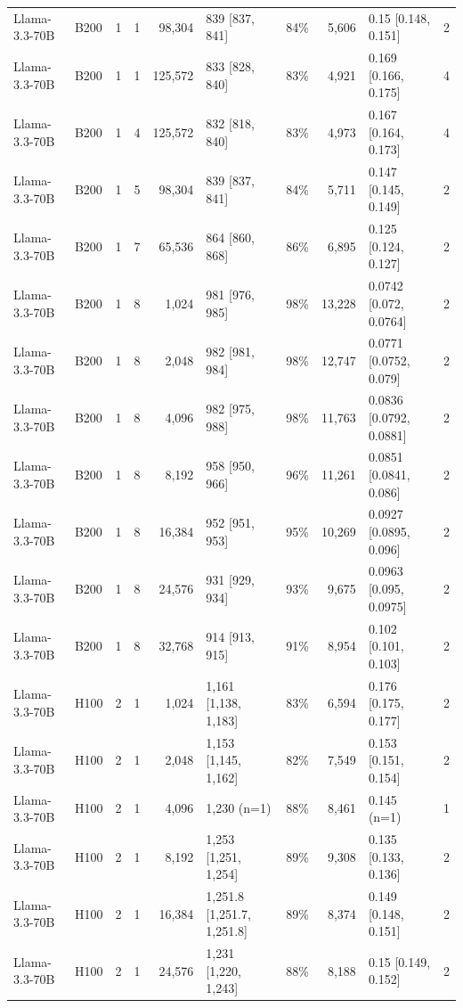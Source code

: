 \begin{landscape}
\begin{longtable}{llrrrlrrlr}
Llama-3.3-70B & B200 & 1 & 1 & 98,304 & 839 {[}837, 841{]} & 84\% & 5,606 & 0.15 {[}0.148, 0.151{]} & 2 \\
Llama-3.3-70B & B200 & 1 & 1 & 125,572 & 833 {[}828, 840{]} & 83\% & 4,921 & 0.169 {[}0.166, 0.175{]} & 4 \\
Llama-3.3-70B & B200 & 1 & 4 & 125,572 & 832 {[}818, 840{]} & 83\% & 4,973 & 0.167 {[}0.164, 0.173{]} & 4 \\
Llama-3.3-70B & B200 & 1 & 5 & 98,304 & 839 {[}837, 841{]} & 84\% & 5,711 & 0.147 {[}0.145, 0.149{]} & 2 \\
Llama-3.3-70B & B200 & 1 & 7 & 65,536 & 864 {[}860, 868{]} & 86\% & 6,895 & 0.125 {[}0.124, 0.127{]} & 2 \\
Llama-3.3-70B & B200 & 1 & 8 & 1,024 & 981 {[}976, 985{]} & 98\% & 13,228 & 0.0742 {[}0.072, 0.0764{]} & 2 \\
Llama-3.3-70B & B200 & 1 & 8 & 2,048 & 982 {[}981, 984{]} & 98\% & 12,747 & 0.0771 {[}0.0752, 0.079{]} & 2 \\
Llama-3.3-70B & B200 & 1 & 8 & 4,096 & 982 {[}975, 988{]} & 98\% & 11,763 & 0.0836 {[}0.0792, 0.0881{]} & 2 \\
Llama-3.3-70B & B200 & 1 & 8 & 8,192 & 958 {[}950, 966{]} & 96\% & 11,261 & 0.0851 {[}0.0841, 0.086{]} & 2 \\
Llama-3.3-70B & B200 & 1 & 8 & 16,384 & 952 {[}951, 953{]} & 95\% & 10,269 & 0.0927 {[}0.0895, 0.096{]} & 2 \\
Llama-3.3-70B & B200 & 1 & 8 & 24,576 & 931 {[}929, 934{]} & 93\% & 9,675 & 0.0963 {[}0.095, 0.0975{]} & 2 \\
Llama-3.3-70B & B200 & 1 & 8 & 32,768 & 914 {[}913, 915{]} & 91\% & 8,954 & 0.102 {[}0.101, 0.103{]} & 2 \\
Llama-3.3-70B & H100 & 2 & 1 & 1,024 & 1,161 {[}1,138, 1,183{]} & 83\% & 6,594 & 0.176 {[}0.175, 0.177{]} & 2 \\
Llama-3.3-70B & H100 & 2 & 1 & 2,048 & 1,153 {[}1,145, 1,162{]} & 82\% & 7,549 & 0.153 {[}0.151, 0.154{]} & 2 \\
Llama-3.3-70B & H100 & 2 & 1 & 4,096 & 1,230 (n=1) & 88\% & 8,461 & 0.145 (n=1) & 1 \\
Llama-3.3-70B & H100 & 2 & 1 & 8,192 & 1,253 {[}1,251, 1,254{]} & 89\% & 9,308 & 0.135 {[}0.133, 0.136{]} & 2 \\
Llama-3.3-70B & H100 & 2 & 1 & 16,384 & 1,251.8 {[}1,251.7, 1,251.8{]} & 89\% & 8,374 & 0.149 {[}0.148, 0.151{]} & 2 \\
Llama-3.3-70B & H100 & 2 & 1 & 24,576 & 1,231 {[}1,220, 1,243{]} & 88\% & 8,188 & 0.15 {[}0.149, 0.152{]} & 2 \\

\end{longtable}
\end{landscape}
